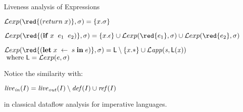 \documentclass[xcolor=x11names,compress,mathserif]{beamer}
\renewcommand{\(}{\begin{columns}}
\renewcommand{\)}{\end{columns}}
\newcommand{\<}[1]{\begin{column}{#1}}
\renewcommand{\>}{\end{column}}
\begin{document}
\begin{frame}{Liveness analysis of Expressions}

\normalsize
$\Lexp{{\red{(return\; x)}}}{\sigma} = \{x.\sigma\}$


\bigskip
\medskip

  $\Lexp{{\red{(\SIF \; x\;\;  e_1\; \; e_2)}}}{\sigma} = \{x.\epsilon\} 
 \cup \Lexp{{\red{ e_1}}}{\sigma} \cup \Lexp{{\red{e_2}}}{\sigma}$



\bigskip
\medskip

$  \Lexp{{\red{(\LET \; x\; \leftarrow \; s \; \IN \; e)}}}{\sigma} = \Lv
           \setminus \{x.*\}
           \cup \mathit{\Lapp{s}{\Lv(x)}}$\\
\hspace*{4.5cm} $ \mbox{ where } \mathsf{L} = \mathcal{L}exp(e,\sigma)$

\bigskip

\pause
Notice the similarity with:
\bigskip

\centerline{$\mathit{live}_\mathit{in}(I)      =     \mathit{live}_\mathit{out}(I)
\setminus \mathit{def\/}(I) \cup \mathit{ref\/}(I)$}
\bigskip

in classical dataflow analysis for imperative languages.
\end{frame}
\end{document}

